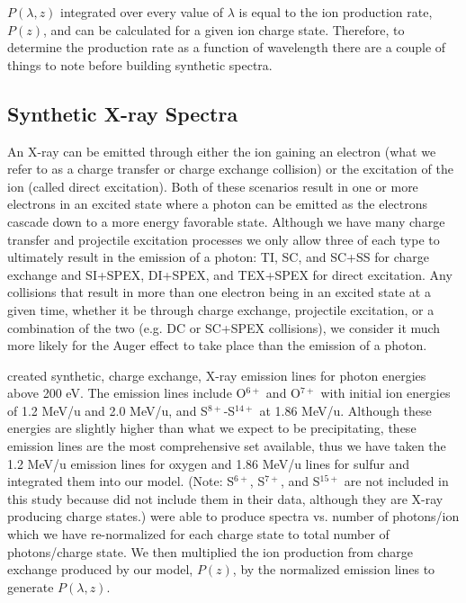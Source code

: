 \documentclass[draft]{agujournal2018}
\begin{document}
$P(\lambda,z)$ integrated over every value of $\lambda$ is equal to the ion production rate, $P(z)$, and can be calculated for a given ion charge state.
Therefore, to determine the production rate as a function of wavelength there are a couple of things to note before building synthetic spectra.

\subsection{Synthetic X-ray Spectra}
\label{sec:SynthXraySpec}

An X-ray can be emitted through either the ion gaining an electron (what we refer to as a charge transfer or charge exchange collision) or the excitation of the ion (called direct excitation).
Both of these scenarios result in one or more electrons in an excited state where a photon can be emitted as the electrons cascade down to a more energy favorable state.
Although we have many charge transfer and projectile excitation processes we only allow three of each type to ultimately result in the emission of a photon: TI, SC, and SC+SS for charge exchange and SI+SPEX, DI+SPEX, and TEX+SPEX for direct excitation.
Any collisions that result in more than one electron being in an excited state at a given time, whether it be through charge exchange, projectile excitation, or a combination of the two (e.g. DC or SC+SPEX collisions), we consider it much more likely for the Auger effect to take place than the emission of a photon.

\citet{hui2010} created synthetic, charge exchange, X-ray emission lines for photon energies above 200 eV.
The emission lines include O$^{6+}$ and O$^{7+}$ with initial ion energies of 1.2 MeV/u and 2.0 MeV/u, and S$^{8+}$-S$^{14+}$ at 1.86 MeV/u.
Although these energies are slightly higher than what we expect to be precipitating, these emission lines are the most comprehensive set available, thus we have taken the 1.2 MeV/u emission lines for oxygen and 1.86 MeV/u lines for sulfur and integrated them into our model.
(Note: S$^{6+}$, S$^{7+}$, and S$^{15+}$ are not included in this study because \citet{hui2010} did not include them in their data, although they are X-ray producing charge states.)
\citet{hui2010} were able to produce spectra vs. number of photons/ion which we have re-normalized for each charge state to total number of photons/charge state.
We then multiplied the ion production from charge exchange produced by our model, $P(z)$, by the normalized emission lines to generate $P(\lambda,z)$.
\end{document}
